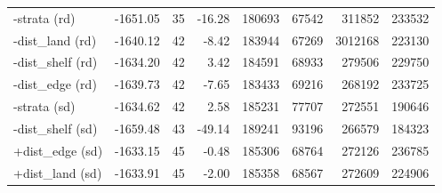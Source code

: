 \documentclass{svjour3}
\begin{document}
\begin{table}[htbp]
\begin{tabular}{lrrrrrrr}
  -strata (rd) & -1651.05 & 35 & -16.28 & 180693 & 67542 & 311852 & 233532 \\
  -dist\_land (rd) & -1640.12 & 42 & -8.42 & 183944 & 67269 & 3012168 & 223130 \\
  -dist\_shelf (rd) & -1634.20 & 42 & 3.42 & 184591 & 68933 & 279506 & 229750 \\
  -dist\_edge (rd) & -1639.73 & 42 & -7.65 & 183433 & 69216 & 268192 & 233725 \\
  -strata (sd) & -1634.62 & 42 & 2.58 & 185231 & 77707 & 272551 & 190646 \\
  -dist\_shelf (sd) & -1659.48 & 43 & -49.14 & 189241 & 93196 & 266579 & 184323 \\
  +dist\_edge (sd) & -1633.15 & 45 & -0.48 & 185306 & 68764 & 272126 & 236785 \\
  +dist\_land (sd) & -1633.91 & 45 & -2.00 & 185358 & 68567 & 272609 & 224906 \\
   \hline
\end{tabular}
\label{tab:sens2012wBS}
\end{table}
\end{document}
